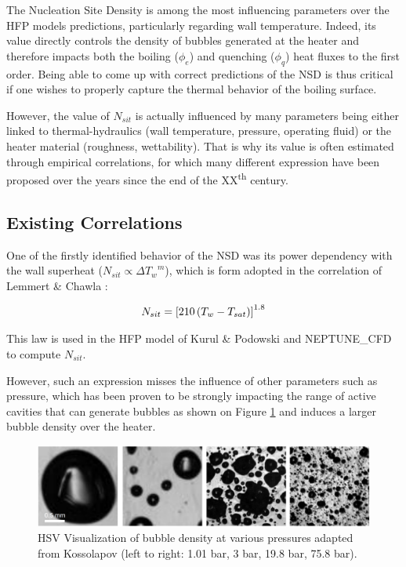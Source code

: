 The Nucleation Site Density is among the most influencing parameters over the HFP models predictions, particularly regarding wall temperature. Indeed, its value directly controls the density of bubbles generated at the heater and therefore impacts both the boiling ($\phi_{e}$) and quenching ($\phi_{q}$) heat fluxes to the first order. Being able to come up with correct predictions of the NSD is thus critical if one wishes to properly capture the thermal behavior of the boiling surface.

However, the value of $N_{sit}$ is actually influenced by many parameters being either linked to thermal-hydraulics (wall temperature, pressure, operating fluid) or the heater material (roughness, wettability). That is why its value is often estimated through empirical correlations, for which many different expression have been proposed over the years since the end of the XX\textsuperscript{th} century.

\subsection{Existing Correlations}

One of the firstly identified behavior of the NSD was its power dependency with the wall superheat ($N_{sit} \propto {\Delta T_{w}}^{m}$), which is form adopted in the correlation of Lemmert \& Chawla \cite{lemmert_influence_1977} : 

\begin{align}
N_{sit}=\left[ 210\left( T_{w}-T_{sat} \right) \right]^{1.8}
\label{eq:nsit_lemmert}
\end{align}

\begin{remark*}{}
This law is used in the HFP model of Kurul \& Podowski and NEPTUNE\_CFD to compute $N_{sit}$.
\end{remark*}

However, such an expression misses the influence of other parameters such as pressure, which has been proven to be strongly impacting the range of active cavities that can generate bubbles as shown on Figure \ref{fig:nsd_P_koss} and induces a larger bubble density over the heater. 

\begin{figure}[h!]
\centering
\includegraphics[width=0.7\linewidth]{img/NSD/nsd_press_koss.png}
\caption{HSV Visualization of bubble density at various pressures adapted from Kossolapov \cite{kossolapov_experimental_2021} (left to right: 1.01 bar, 3 bar, 19.8 bar, 75.8 bar). }
\label{fig:nsd_P_koss}
\end{figure}

